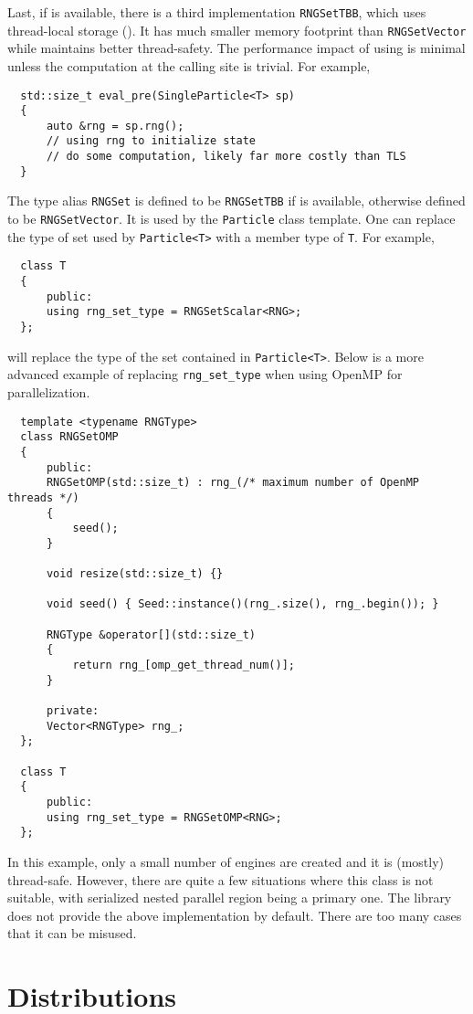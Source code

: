 Last, if \tbb is available, there is a third implementation \verb|RNGSetTBB|,
which uses thread-local storage (\tls). It has much smaller memory footprint
than \verb|RNGSetVector| while maintains better thread-safety. The performance
impact of using \tls is minimal unless the computation at the calling site is
trivial. For example,
\begin{Verbatim}
  std::size_t eval_pre(SingleParticle<T> sp)
  {
      auto &rng = sp.rng();
      // using rng to initialize state
      // do some computation, likely far more costly than TLS
  }
\end{Verbatim}
The type alias \verb|RNGSet| is defined to be \verb|RNGSetTBB| if \tbb is
available, otherwise defined to be \verb|RNGSetVector|. It is used by the
\verb|Particle| class template. One can replace the type of \rng set used by
\verb|Particle<T>| with a member type of \verb|T|. For example,
\begin{Verbatim}
  class T
  {
      public:
      using rng_set_type = RNGSetScalar<RNG>;
  };
\end{Verbatim}
will replace the type of the \rng set contained in \verb|Particle<T>|. Below is
a more advanced example of replacing \verb|rng_set_type| when using OpenMP for
parallelization.
\begin{Verbatim}
  template <typename RNGType>
  class RNGSetOMP
  {
      public:
      RNGSetOMP(std::size_t) : rng_(/* maximum number of OpenMP threads */)
      {
          seed();
      }

      void resize(std::size_t) {}

      void seed() { Seed::instance()(rng_.size(), rng_.begin()); }

      RNGType &operator[](std::size_t)
      {
          return rng_[omp_get_thread_num()];
      }

      private:
      Vector<RNGType> rng_;
  };

  class T
  {
      public:
      using rng_set_type = RNGSetOMP<RNG>;
  };
\end{Verbatim}
In this example, only a small number of \rng{} engines are created and it is
(mostly) thread-safe. However, there are quite a few situations where this
class is not suitable, with serialized nested parallel region being a primary
one. The library does not provide the above implementation by default. There
are too many cases that it can be misused.

\section{Distributions}
\label{sec:Distributions}

